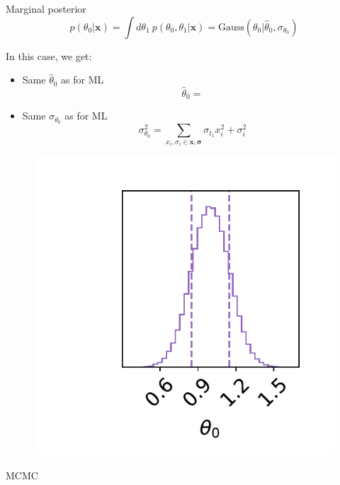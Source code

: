\documentclass[
aspectratio=169,
14pt,
professionalfonts
]{beamer}
\begin{document}
\begin{frame}{Marginal posterior}
\vspace{-1cm}
    $$p(\theta_0|\mathbf{x}) = \int d\theta_1 ~ p(\theta_0, \theta_1|\mathbf{x}) = \text{Gauss}(\theta_0 | \hat \theta_0, \sigma_{\theta_0})$$
    \begin{minipage}{0.49\linewidth}
    In this case, we get:
        \begin{itemize}
            \item Same $\hat \theta_0$ as for ML
            $$
            \hat \theta_0 =
            $$
            \item Same $\sigma_{\theta_0}$ as for ML
            $$
            \sigma_{\theta_0}^2 = \sum_{x_i,  \sigma_i\in \mathbf{x}, \mathbf{\sigma}}\sigma_{t_1}x_i^2 + \sigma_i^2
            $$
        \end{itemize}
    \end{minipage}
    \begin{minipage}{0.49\linewidth}
    \begin{figure}
        \centering
        \includegraphics[width=0.9\linewidth]{../plots/marginal_posterior.pdf}
    \end{figure}
    \end{minipage}
\end{frame}

\begin{frame}
\center
\Large
MCMC
\end{frame}
\end{document}
